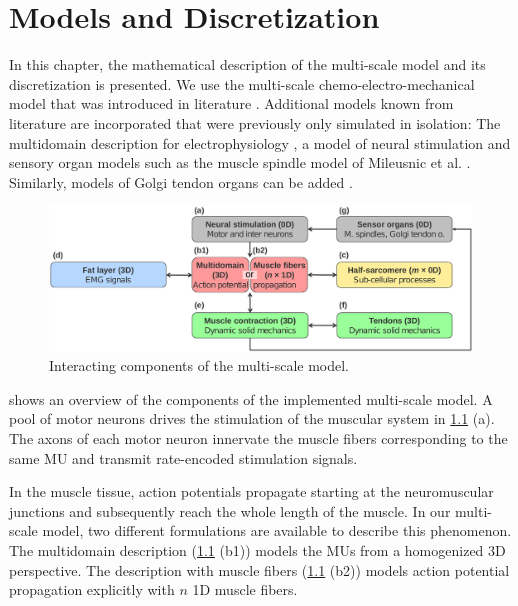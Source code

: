 
\chapter{Models and Discretization}\label{chap:models_and_discretization}
In this chapter, the mathematical description of the multi-scale model and its discretization is presented. 
We use the multi-scale chemo-electro-mechanical model that was introduced in literature \cite{Roehrle2012,Heidlauf2013,Heidlauf2015Diss,Mordhorst2015}. Additional models known from literature are incorporated that  were previously only simulated in isolation: The multidomain description for electrophysiology \cite{Klotz2020}, a model of neural stimulation \cite{Cisi2008} and sensory organ models such as the muscle spindle model of Mileusnic et al. \cite{Mileusnic2006Spindle}. Similarly, models of Golgi tendon organs can be added \cite{Mileusnic2006Golgi}.

\begin{figure}%
  \centering%
  \includegraphics[width=\textwidth]{images/theory/model_schematic.pdf}%
  \caption{Interacting components of the multi-scale model.}%
  \label{fig:multi-scale-model}%
\end{figure}

 shows an overview of the components of the implemented multi-scale model.
A pool of motor neurons drives the stimulation of the muscular system in \cref{fig:multi-scale-model} (a). 
The axons of each motor neuron innervate the muscle fibers corresponding to the same MU and transmit rate-encoded stimulation signals.

In the muscle tissue, action potentials propagate starting at the neuromuscular junctions and subsequently reach the whole length of the muscle.
In our multi-scale model, two different formulations are available to describe this phenomenon. The multidomain description (\cref{fig:multi-scale-model} (b1)) models the MUs from a  homogenized 3D perspective. The description with muscle fibers (\cref{fig:multi-scale-model} (b2)) models action potential propagation explicitly with $n$ 1D muscle fibers. 

